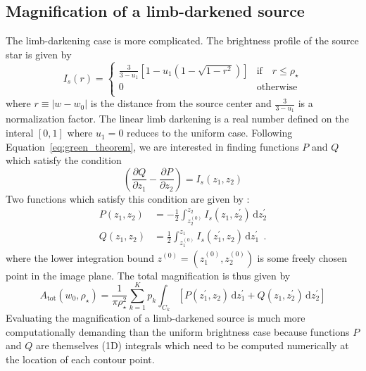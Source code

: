 \documentclass[12pt,dvipsnames]{report}
\newcommand{\ud}{\,\mathrm{d}}
\newcommand{\hquad}{~~}
\begin{document}
\subsection{Magnification of a limb-darkened source}
\label{sec:mag_limbdark}
The limb-darkening case is more complicated. The brightness profile of the source star is given
by 
\begin{equation}
    I_s(r)=
    \begin{cases}\frac{3}{3-u_1}\left[1 - u_1\left(1 - \sqrt{1-r^2}\right)\right] &\text{if} \quad r\leq\rho_\star\\
        0 &\text{otherwise}\\
    \end{cases}
    \label{eq:limbdark_profile}
\end{equation}
where $r\equiv |w-w_0|$ is the distance from the source center and $\frac{3}{3-u_1}$ is a 
normalization factor. The linear limb darkening 
is a real number defined on the interal $[0,1]$ where $u_1=0$ reduces to the uniform case.
Following Equation~\ref{eq:green_theorem}, we are interested in finding  functions $P$ and $Q$
which satisfy the condition
\begin{equation}
\left(\frac{\partial Q}{\partial z_{1}} - 
\frac{\partial P}{\partial z_{2}} \right) = I_s(z_1,z_2)
\end{equation}
Two functions which satisfy this condition are given by \citep{1998A&A...333L..79D}:
\begin{align}
P\left(z_1, z_2\right)&=-\frac{1}{2} \int_{z_2^{(0)}}^{z_2} I_s\left(z_1, z_2^{\prime}\right) \ud z_2^{\prime}\\
Q\left(z_1, z_2\right)&=\frac{1}{2} \int_{z_1^{(0)}}^{z_1} I_s\left(z_1^{\prime}, z_2\right) \ud z_1^{\prime}\hquad .
\label{eq:p_and_q_functions_ld}
\end{align}
where the lower integration bound $z^{(0)}=(z_1^{(0)},z_2^{(0)})$ is some freely chosen point
in the image plane. The total magnification is thus given by
\begin{equation}
    A_\mathrm{tot}\left(w_0, \rho_{\star}\right)=\frac{1}{\pi \rho_{\star}^{2}}
    \sum_{k=1}^Kp_k\int_{C_k} \left[P(z_1^\prime, z_2)\ud z_1^\prime + Q(z_1, z_2^\prime)\ud z_2^\prime\right]
    \label{eq:mag_green_theorem_ld_expanded}
\end{equation}
Evaluating the magnification of a limb-darkened source is much 
more computationally demanding than the uniform brightness case  because functions $P$ and
$Q$ are themselves (1D) integrals which need to be computed numerically at the location of 
each contour point.
\end{document}
